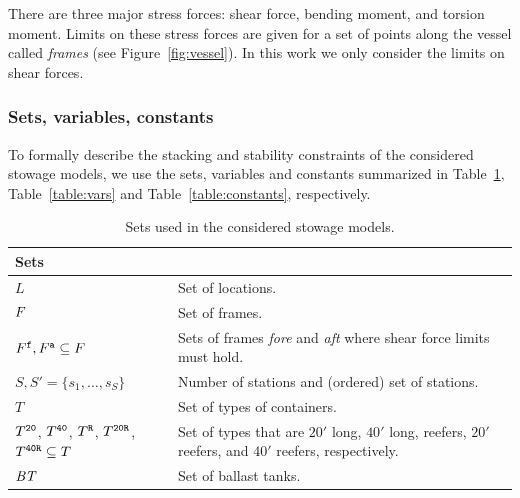 There are three major stress forces: shear force, bending moment, and torsion moment. Limits on these stress forces are given for a set of points along the vessel called \emph{frames} (see Figure~\ref{fig:vessel}). In this work we only consider the limits on shear forces.

\subsubsection*{Sets, variables, constants}
To formally describe the stacking and stability constraints of the considered stowage models, we use the sets, variables and constants summarized in Table~\ref{table:sets}, Table~\ref{table:vars} and Table~\ref{table:constants}, respectively.
\begin{table}[p]
\centering
\begin{tabular}{p{5cm}p{7.5cm}}%
\multicolumn{2}{l}{\textbf{Sets}}\\
\hline\noalign{\smallskip}
$L$ 
	& Set of locations.\\
$F$
	&Set of frames.\\
$F^{\texttt{f}},F^{\texttt{a}}\subseteq F$
	&Sets of frames \emph{fore} and \emph{aft} where shear force limits must hold.\\
$S, S' = \{s_1,\ldots, s_S\}$ 
	&Number of stations and (ordered) set of stations.\\
$T$
	&Set of types of containers.\\ 
$T^{\texttt{20}}$, $T^{\texttt{40}}$, $T^{\texttt{R}}$, $T^{\texttt{20R}}$, $T^{\texttt{40R}}\subseteq T$ 
	&Set of types that are $20'$ long, $40'$ long, reefers, $20'$ reefers, and $40'$ reefers, respectively.\\ 
$\mathit{BT}$ 
	& Set of ballast tanks.\\
\end{tabular}
\caption{Sets used in the considered stowage models.}
\label{table:sets}
\end{table}
%
